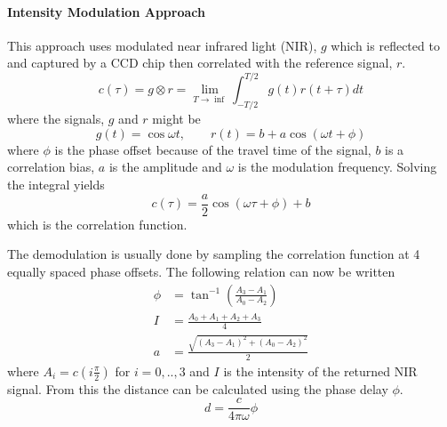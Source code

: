 \paragraph{Intensity Modulation Approach}
This approach uses modulated near infrared light (NIR), $g$ which is reflected to and
captured by a CCD chip then correlated with the reference signal, $r$. 
\begin{equation}
    c(\tau) = g \otimes r = \lim_{T \rightarrow \inf} \int^{T/2}_{-T/2} g(t) r(t + \tau) dt
\end{equation}
where the signals, $g$ and $r$ might be
\begin{equation}
    g(t) = \cos{\omega t}, \quad \quad r(t) = b + a \cos{(\omega t + \phi)}
\end{equation}
where $\phi$ is the phase offset because of the travel time of the signal, $b$ is a
correlation bias, $a$ is the amplitude and $\omega$ is the modulation frequency. Solving
the integral yields 
\begin{equation}
    c(\tau) = \frac{a}{2} \cos{(\omega \tau + \phi )} + b
\end{equation}
which is the correlation function. 

The demodulation is usually done by sampling the correlation function at 4 equally spaced
phase offsets. The following relation can now be written
\begin{equation}
    \begin{aligned}
        \phi &= \tan^{-1} (\frac{A_3 - A_1}{A_0 - A_2}) \\
        I &= \frac{A_0 + A_1 + A_2 + A_3}{4} \\
        a &= \frac{\sqrt{(A_3 - A_1)^2 + (A_0 - A_2)^2}}{2}
    \end{aligned}
\end{equation}
where $A_i = c(i \frac{\pi}{2})$ for $ i = 0,..,3$ and $I$ is the intensity of the returned NIR
signal. From this the distance can be calculated using the phase delay $\phi$. 
\begin{equation}
    d = \frac{c}{4 \pi \omega} \phi
\end{equation}

